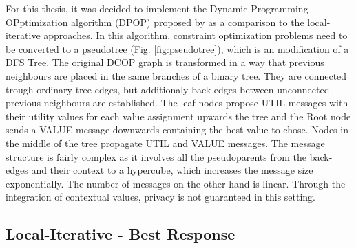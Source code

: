 For this thesis, it was decided to implement the Dynamic Programming OPptimization algorithm (DPOP) proposed by \cite{Petcu2003} as a comparison to the local-iterative approaches. In this algorithm, constraint optimization problems need to be converted to a pseudotree (Fig. \ref{fig:pseudotree}), which is an modification of a DFS Tree. The original DCOP graph is transformed in a way that previous neighbours are placed in the same branches of a binary tree. They are connected trough ordinary tree edges, but additionaly back-edges between unconnected previous neighbours are established. The leaf nodes propose UTIL messages with their utility values for each value assignment upwards the tree and the Root node sends a VALUE message downwards containing the best value to chose. Nodes in the middle of the tree propagate UTIL and VALUE messages. The message structure is fairly complex as it involves all the pseudoparents from the back-edges and their context to a hypercube, which increases the message size exponentially. The number of messages on the other hand is linear. Through the integration of contextual values, privacy is not guaranteed in this setting.

\subsection{Local-Iterative - Best Response}

